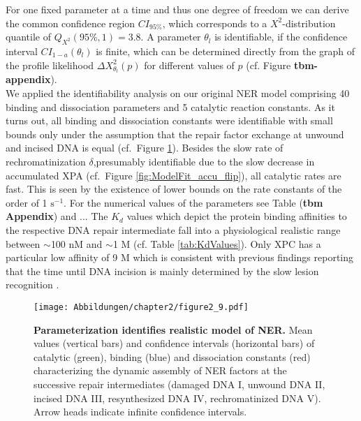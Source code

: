 For one fixed parameter at a time and thus one degree of freedom we can derive the common confidence region $CI_{95\%}$, which corresponds to a $X^2$-distribution quantile of $Q_{X^2}(95\%,1)=3.8$. A parameter $\theta_l$ is identifiable, if the confidence interval $CI_{1-a}(\theta_l)$ is finite, which can be determined directly from the graph of the profile likelihood $\Delta X_{\theta_l}^2(p)$ for different values of $p$ (cf. Figure \textbf{tbm-appendix}).\\ 
We applied the identifiability analysis on our original NER model comprising 40 binding and dissociation parameters and 5 catalytic reaction constants. As it turns out, all binding and dissociation constants were identifiable with small bounds only under the assumption that the repair factor exchange at unwound and incised DNA is equal (cf.\ Figure \ref{fig:PLE_NER_overview}). Besides the slow rate of rechromatinization $\delta$,presumably identifiable due to the slow decrease in accumulated XPA (cf.\ Figure \ref{fig:ModelFit_accu_flip}), all catalytic rates are fast. This is seen by the existence of lower bounds on the rate constants of the order of 1 $\text{s}^{-1}$. For the numerical values of the parameters see Table (\textbf{tbm Appendix}) and ...
The $K_d$ values which depict the protein binding affinities to the respective DNA repair intermediate fall into a physiological realistic range between $\sim$100 nM and $\sim$1 \textmu M (cf. Table \ref{tab:KdValues}). Only XPC has a particular low affinity of 9 \textmu M which is consistent with previous findings reporting that the time until DNA incision is mainly determined by the slow lesion recognition \cite{Luijsterburg2010}.        

\begin{figure}[htbp]
	\begin{center}
		\texttt{[image: Abbildungen/chapter2/figure2\_9.pdf]}
		\caption{\textbf{Parameterization identifies realistic model of NER.} Mean values (vertical bars) and confidence intervals (horizontal bars) of catalytic (green), binding (blue) and dissociation constants (red) characterizing the dynamic assembly of NER factors at the successive repair intermediates (damaged DNA I, unwound DNA II, incised DNA III, resynthesized DNA IV, rechromatinized DNA V). Arrow heads indicate infinite confidence intervals.}
		\label{fig:PLE_NER_overview}
	\end{center}
\end{figure}

